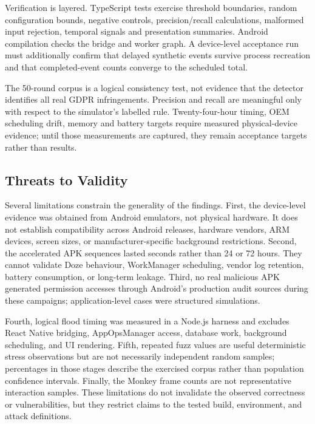 Verification is layered. TypeScript tests exercise threshold boundaries, random configuration bounds, negative controls, precision/recall calculations, malformed input rejection, temporal signals and presentation summaries. Android compilation checks the bridge and worker graph. A device-level acceptance run must additionally confirm that delayed synthetic events survive process recreation and that completed-event counts converge to the scheduled total.

The 50-round corpus is a logical consistency test, not evidence that the detector identifies all real GDPR infringements. Precision and recall are meaningful only with respect to the simulator's labelled rule. Twenty-four-hour timing, OEM scheduling drift, memory and battery targets require measured physical-device evidence; until those measurements are captured, they remain acceptance targets rather than results.

\subsection{Threats to Validity}

Several limitations constrain the generality of the findings. First, the device-level evidence was obtained from Android emulators, not physical hardware. It does not establish compatibility across Android releases, hardware vendors, ARM devices, screen sizes, or manufacturer-specific background restrictions. Second, the accelerated APK sequences lasted seconds rather than 24 or 72 hours. They cannot validate Doze behaviour, WorkManager scheduling, vendor log retention, battery consumption, or long-term leakage. Third, no real malicious APK generated permission accesses through Android's production audit sources during these campaigns; application-level cases were structured simulations.

Fourth, logical flood timing was measured in a Node.js harness and excludes React Native bridging, AppOpsManager access, database work, background scheduling, and UI rendering. Fifth, repeated fuzz values are useful deterministic stress observations but are not necessarily independent random samples; percentages in those stages describe the exercised corpus rather than population confidence intervals. Finally, the Monkey frame counts are not representative interaction samples. These limitations do not invalidate the observed correctness or vulnerabilities, but they restrict claims to the tested build, environment, and attack definitions.

